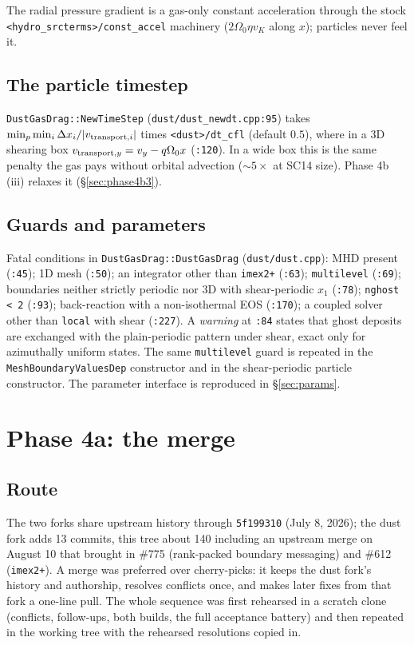 \documentclass[11pt]{article}
\newcommand{\code}[1]{\texttt{#1}}
\newcommand{\file}[1]{\texttt{\small #1}}
\newcommand{\fn}[1]{\texttt{\small #1}}
\newcommand{\Om}{\Omega_0}
\newcommand{\qom}{q\Om}
\begin{document}
The radial pressure gradient is a gas-only constant acceleration through the stock
\code{<hydro\_srcterms>/const\_accel} machinery ($2\Om\eta v_K$ along $x$); particles
never feel it.

\subsection{The particle timestep}
\label{sec:dt}

\fn{DustGasDrag::NewTimeStep} (\file{dust/dust\_newdt.cpp:95}) takes
$\min_p \min_i \Delta x_i/|v_{{\rm transport},i}|$ times \code{<dust>/dt\_cfl}
(default $0.5$), where in a 3D shearing box $v_{{\rm transport},y} = v_y - \qom x$
(\file{:120}). In a wide box this is the same penalty the gas pays without orbital
advection ($\sim 5\times$ at SC14 size). Phase 4b (iii) relaxes it
(\S\ref{sec:phase4b3}).

\subsection{Guards and parameters}

Fatal conditions in \fn{DustGasDrag::DustGasDrag} (\file{dust/dust.cpp}): MHD
present (\code{:45}); 1D mesh (\code{:50}); an integrator other than \code{imex2+}
(\code{:63}); \code{multilevel} (\code{:69}); boundaries neither strictly periodic
nor 3D with shear-periodic $x_1$ (\code{:78}); \code{nghost < 2} (\code{:93});
back-reaction with a non-isothermal EOS (\code{:170}); a coupled solver other than
\code{local} with shear (\code{:227}). A \emph{warning} at \code{:84} states that
ghost deposits are exchanged with the plain-periodic pattern under shear, exact only
for azimuthally uniform states. The same \code{multilevel} guard is repeated in the
\code{MeshBoundaryValuesDep} constructor and in the shear-periodic particle
constructor. The parameter interface is reproduced in \S\ref{sec:params}.

\section{Phase 4a: the merge}
\label{sec:phase4a}

\subsection{Route}

The two forks share upstream history through \code{5f199310} (July 8, 2026); the
dust fork adds 13 commits, this tree about 140 including an upstream merge on
August 10 that brought in \#775 (rank-packed boundary messaging) and \#612
(\code{imex2+}). A merge was preferred over cherry-picks: it keeps the dust fork's
history and authorship, resolves conflicts once, and makes later fixes from that
fork a one-line pull. The whole sequence was first rehearsed in a scratch clone
(conflicts, follow-ups, both builds, the full acceptance battery) and then repeated
in the working tree with the rehearsed resolutions copied in.
\end{document}
